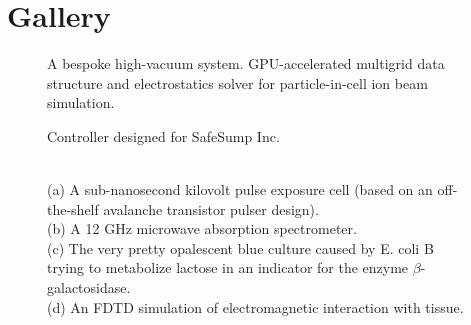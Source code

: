 \documentclass[fleqn,11pt]{article}
\begin{document}
\clearpage

\section{Gallery}
\begin{figure}[H]
	\centering
	\caption*{A bespoke high-vacuum system. GPU-accelerated multigrid data structure and electrostatics solver for particle-in-cell ion beam simulation.}
	\hfill
	
\end{figure}



\begin{figure}[H]
	\centering
	\caption*{Controller designed for SafeSump Inc.}
	\hfill
	
\end{figure}



\begin{figure}[H]
	\centering
	
	
	\hfill
	
	\caption*{\\ (a) A sub-nanosecond kilovolt pulse exposure cell (based on an off-the-shelf avalanche transistor pulser design). \\ (b) A 12 GHz microwave absorption spectrometer. \\(c) The very pretty opalescent blue culture caused by E. coli B trying to metabolize lactose in an indicator for the enzyme $\beta$-galactosidase.\\ (d) An FDTD simulation of electromagnetic interaction with tissue. }
\end{figure}
\end{document}
